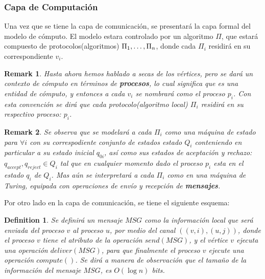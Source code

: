 \documentclass[10pt]{report}
\newtheorem*{remark}{Remark}
\newtheorem{definition}{Definition}
\begin{document}
    \subsubsection{Capa de Computación}
    Una vez que se tiene la capa de comunicación, se presentará la capa formal del modelo de
    cómputo.\newline
    El modelo estara controlado por un algoritmo $\Pi$, que estará compuesto de protocolos(algoritmos)
    $\Pi_{1},\mathellipsis,\Pi_{n}$, donde cada $\Pi_{i}$ residirá en su correspondiente $v_{i}$.
    \newline
    \begin{remark}
        Hasta ahora hemos hablado a secas de los vértices, pero se dará un contexto
        de cómputo en términos de \textbf{procesos}, lo cual significa que es una entidad de cómputo, y entonces a cada $v_{i}$
        se nombrará como el proceso $p_{i}$.\newline
        Con esta convención se dirá que cada protocolo(algoritmo local) $\Pi_{i}$ residirá en su respectivo proceso:
        $p_{i}$.

    \end{remark}
        \begin{remark}
        Se observa que se modelará a cada $\Pi_{i}$ como una máquina de estado para $\forall i$ con su
        correspodiente conjunto de estados estado $Q_{i}$ conteniendo en particular a su estado inicial  $q_{0i}$, así como sus estados de
        aceptación y rechazo: $q_{accept},q_{reject}\in Q_{i}$ tal que en cualquier
        momento dado el proceso $p_{i}$ esta en el estado $q_{i}$ de $Q_{i}$.
        \space
        Mas aún se interpretará a cada $\Pi_{i}$ como en una máquina de Turing, equipada con operaciones de envío y
        recepción de \textbf{mensajes}.
    \end{remark}
    \newline
    Por otro lado en la capa de comunicación, se tiene el siguiente esquema:
    \newline
    \begin{definition}
        Se definirá un mensaje $MSG$ como la información local que será enviada del proceso $v$ al proceso $u$,
        por medio del canal $((v,i),(u,j))$, donde el proceso $v$ tiene el atributo de la operación $send(MSG)$, y el vértice
        $v$ ejecuta una operación $deliver(MSG)$, para que finalmente el proceso $v$ ejecute una operación $compute()$.
        \newline
        Se dirá a manera de observación que el tamaño de la información del mensaje $MSG$, es $O(\log n)$ bits.
    \end{definition}
\end{document}
